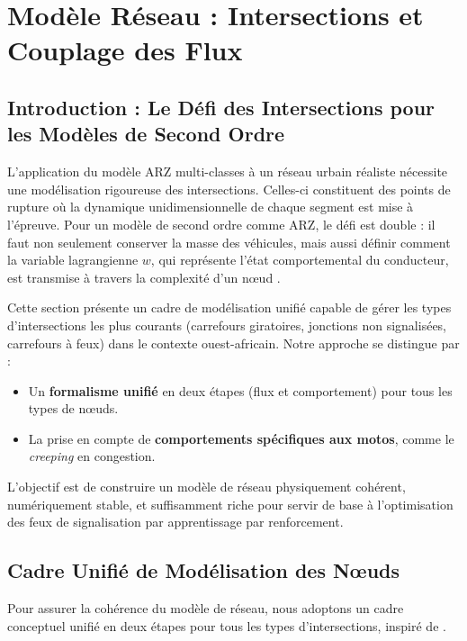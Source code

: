 \section{Modèle Réseau : Intersections et Couplage des Flux}
\label{sec:modeles_intersections}

\subsection{Introduction : Le Défi des Intersections pour les Modèles de Second Ordre}
L'application du modèle ARZ multi-classes à un réseau urbain réaliste nécessite une modélisation rigoureuse des intersections. Celles-ci constituent des points de rupture où la dynamique unidimensionnelle de chaque segment est mise à l'épreuve. Pour un modèle de second ordre comme ARZ, le défi est double : il faut non seulement conserver la masse des véhicules, mais aussi définir comment la variable lagrangienne $w$, qui représente l'état comportemental du conducteur, est transmise à travers la complexité d'un nœud \cite{GaravelloPiccoli2006}.

Cette section présente un cadre de modélisation unifié capable de gérer les types d'intersections les plus courants (carrefours giratoires, jonctions non signalisées, carrefours à feux) dans le contexte ouest-africain. Notre approche se distingue par :
\begin{itemize}
    \item Un \textbf{formalisme unifié} en deux étapes (flux et comportement) pour tous les types de nœuds.
    \item La prise en compte de \textbf{comportements spécifiques aux motos}, comme le \textit{creeping} en congestion.
\end{itemize}
L'objectif est de construire un modèle de réseau physiquement cohérent, numériquement stable, et suffisamment riche pour servir de base à l'optimisation des feux de signalisation par apprentissage par renforcement.

\subsection{Cadre Unifié de Modélisation des Nœuds}
Pour assurer la cohérence du modèle de réseau, nous adoptons un cadre conceptuel unifié en deux étapes pour tous les types d'intersections, inspiré de \cite{HoldenRisebro2015, AndreianovPanov2012}.

